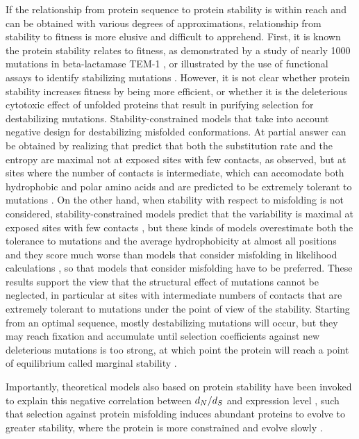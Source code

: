 If the relationship from protein sequence to protein stability is within reach and can be obtained with various degrees of approximations, relationship from stability to fitness is more elusive and difficult to apprehend.
First, it is known the protein stability relates to fitness, as demonstrated by a study of nearly 1000 mutations in beta-lactamase TEM-1 \citep{Jacquier2013}, or illustrated by the use of functional assays to identify stabilizing mutations \citep{Araya2012}.
However, it is not clear whether protein stability increases fitness by being more efficient, or whether it is the deleterious cytotoxic effect of unfolded proteins that result in purifying selection for destabilizing mutations.
Stability-constrained models that take into account negative design for destabilizing misfolded conformations.
At partial answer can be obtained by realizing that \citep{Berezovsky2007, Noivirt-Brik2009, Minning2013} predict that both the \gls{substitution} rate and the entropy are maximal not at exposed sites with few contacts, as observed, but at sites where the number of contacts is intermediate, which can accomodate both hydrophobic and polar amino acids and are predicted to be extremely tolerant to mutations \citep{Jimenez2018}.
On the other hand, when stability with respect to misfolding is not considered, stability-constrained models predict that the variability is maximal at exposed sites with few contacts \citep{Scherrer2012,Echave2015}, but these kinds of models overestimate both the tolerance to mutations and the average hydrophobicity at almost all positions \citep{Jimenez2018} and they score much worse than models that consider misfolding in \gls{likelihood} calculations \citep{Arenas2015a, Arenas2017}, so that models that consider misfolding have to be preferred.
These results support the view that the structural effect of mutations cannot be neglected, in particular at sites with intermediate numbers of contacts that are extremely tolerant to mutations under the point of view of the stability.
Starting from an optimal sequence, mostly destabilizing mutations will occur, but they may reach fixation and accumulate until selection coefficients against new deleterious mutations is too strong, at which point the protein will reach a point of equilibrium called marginal stability \citep{Taverna2002, Bloom2007}.

Importantly, theoretical models also based on protein stability have been invoked to explain this negative correlation between $d_N / d_S$ and expression level \citep{Wilke2006, Drummond2008}, such that selection against protein misfolding induces abundant proteins to evolve to greater stability, where the protein is more constrained and evolve slowly \citep{Serohijos2012}.

